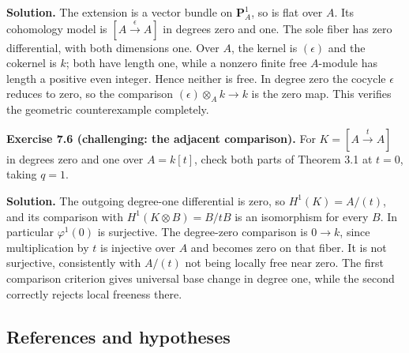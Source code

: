 \documentclass[11pt]{article}
\begin{document}
\textbf{Solution.} The extension is a vector bundle on
\(\mathbf P^1_A\), so is flat over \(A\). Its cohomology model is
\([A\xrightarrow{\epsilon}A]\) in degrees zero and one. The sole fiber
has zero differential, with both dimensions one. Over \(A\), the kernel
is \((\epsilon)\) and the cokernel is \(k\); both have length one, while
a nonzero finite free \(A\)-module has length a positive even integer.
Hence neither is free. In degree zero the cocycle \(\epsilon\) reduces
to zero, so the comparison \((\epsilon)\otimes_A k\to k\) is the zero
map. This verifies the geometric counterexample completely.

\textbf{Exercise 7.6 (challenging: the adjacent comparison).} For
\(K=[A\xrightarrow{t}A]\) in degrees zero and one over \(A=k[t]\), check
both parts of Theorem 3.1 at \(t=0\), taking \(q=1\).

\textbf{Solution.} The outgoing degree-one differential is zero, so
\(H^1(K)=A/(t)\), and its comparison with \(H^1(K\otimes B)=B/tB\) is an
isomorphism for every \(B\). In particular \(\varphi^1(0)\) is
surjective. The degree-zero comparison is \(0\to k\), since
multiplication by \(t\) is injective over \(A\) and becomes zero on that
fiber. It is not surjective, consistently with \(A/(t)\) not being
locally free near zero. The first comparison criterion gives universal
base change in degree one, while the second correctly rejects local
freeness there.

\subsection{References and hypotheses}\label{references-and-hypotheses}
\end{document}
